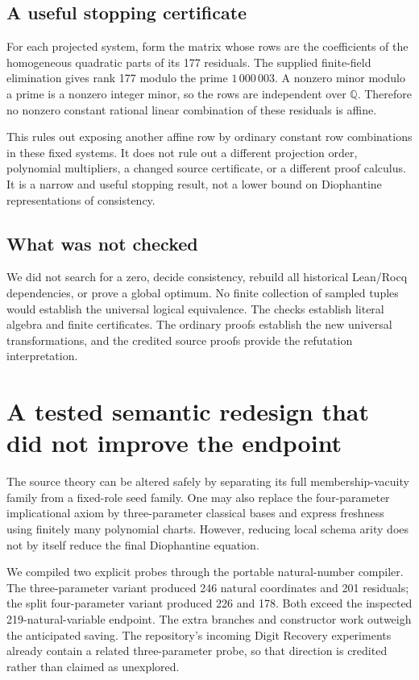 \documentclass[11pt]{article}
\theoremstyle{remark}\newtheorem{remark}[theorem]{Remark}
\newcommand{\Q}{\mathbb Q}
\begin{document}
\subsection{A useful stopping certificate}

For each projected system, form the matrix whose rows are the
coefficients of the homogeneous quadratic parts of its 177 residuals.
The supplied finite-field elimination gives rank 177 modulo the prime
$1\,000\,003$. A nonzero minor modulo a prime is a nonzero integer
minor, so the rows are independent over $\Q$. Therefore no nonzero
constant rational linear combination of these residuals is affine.

This rules out exposing another affine row by ordinary constant row
combinations in these fixed systems. It does not rule out a different
projection order, polynomial multipliers, a changed source certificate,
or a different proof calculus. It is a narrow and useful stopping result,
not a lower bound on Diophantine representations of consistency.

\subsection{What was not checked}

We did not search for a zero, decide consistency, rebuild all historical
Lean/Rocq dependencies, or prove a global optimum. No finite collection
of sampled tuples would establish the universal logical equivalence.
The checks establish literal algebra and finite certificates. The
ordinary proofs establish the new universal transformations, and the
credited source proofs provide the refutation interpretation.

\section{A tested semantic redesign that did not improve the endpoint}

The source theory can be altered safely by separating its full
membership-vacuity family from a fixed-role seed family. One may also
replace the four-parameter implicational axiom by three-parameter
classical bases and express freshness using finitely many polynomial
charts. However, reducing local schema arity does not by itself
reduce the final Diophantine equation.

We compiled two explicit probes through the portable natural-number
compiler. The three-parameter variant produced 246 natural coordinates
and 201 residuals; the split four-parameter variant produced 226 and 178.
Both exceed the inspected 219-natural-variable endpoint. The extra
branches and constructor work outweigh the anticipated saving.
The repository's incoming Digit Recovery experiments already contain
a related three-parameter probe, so that direction is credited rather
than claimed as unexplored.
\end{document}

